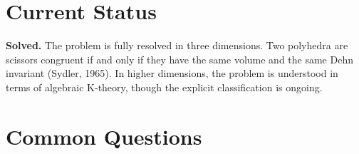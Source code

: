 \section{Current Status}

\begin{solvedbox}
\textbf{Solved.} The problem is fully resolved in three dimensions. Two polyhedra are scissors congruent if and only if they have the same volume and the same Dehn invariant (Sydler, 1965). In higher dimensions, the problem is understood in terms of algebraic K-theory, though the explicit classification is ongoing.
\end{solvedbox}

\section*{Common Questions}

